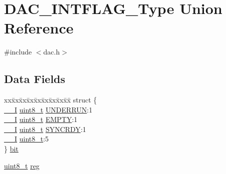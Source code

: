 \hypertarget{union_d_a_c___i_n_t_f_l_a_g___type}{}\section{D\+A\+C\+\_\+\+I\+N\+T\+F\+L\+A\+G\+\_\+\+Type Union Reference}
\label{union_d_a_c___i_n_t_f_l_a_g___type}


{\ttfamily \#include $<$dac.\+h$>$}

\subsection*{Data Fields}
\begin{DoxyCompactItemize}
\item 
\begin{tabbing}
xx\=xx\=xx\=xx\=xx\=xx\=xx\=xx\=xx\=\kill
struct \{\\
\>\mbox{\hyperlink{core__cm0plus_8h_af63697ed9952cc71e1225efe205f6cd3}{\_\_I}} \mbox{\hyperlink{union_d_a_c___i_n_t_f_l_a_g___type_a5b4208c6f4c4a4290c4f2804d1eb1d5b}{uint8\_t}} \mbox{\hyperlink{union_d_a_c___i_n_t_f_l_a_g___type_a100468656a7f010c7bed39a72d5bf436}{UNDERRUN}}:1\\
\>\mbox{\hyperlink{core__cm0plus_8h_af63697ed9952cc71e1225efe205f6cd3}{\_\_I}} \mbox{\hyperlink{union_d_a_c___i_n_t_f_l_a_g___type_a5b4208c6f4c4a4290c4f2804d1eb1d5b}{uint8\_t}} \mbox{\hyperlink{union_d_a_c___i_n_t_f_l_a_g___type_a9b286a819bbfab7c4fd92bff3620ac92}{EMPTY}}:1\\
\>\mbox{\hyperlink{core__cm0plus_8h_af63697ed9952cc71e1225efe205f6cd3}{\_\_I}} \mbox{\hyperlink{union_d_a_c___i_n_t_f_l_a_g___type_a5b4208c6f4c4a4290c4f2804d1eb1d5b}{uint8\_t}} \mbox{\hyperlink{union_d_a_c___i_n_t_f_l_a_g___type_ae8a10cfa0bb63130ae1e8150943d680b}{SYNCRDY}}:1\\
\>\mbox{\hyperlink{core__cm0plus_8h_af63697ed9952cc71e1225efe205f6cd3}{\_\_I}} \mbox{\hyperlink{union_d_a_c___i_n_t_f_l_a_g___type_a5b4208c6f4c4a4290c4f2804d1eb1d5b}{uint8\_t}}:5\\
\} \mbox{\hyperlink{union_d_a_c___i_n_t_f_l_a_g___type_a22176a9eba77ce65828ed30282d308cf}{bit}}\\

\end{tabbing}\item 
\mbox{\hyperlink{union_d_a_c___i_n_t_f_l_a_g___type_a5b4208c6f4c4a4290c4f2804d1eb1d5b}{uint8\+\_\+t}} \mbox{\hyperlink{union_d_a_c___i_n_t_f_l_a_g___type_a9428adc9af4653a2050e2536b55dec8d}{reg}}
\end{DoxyCompactItemize}



